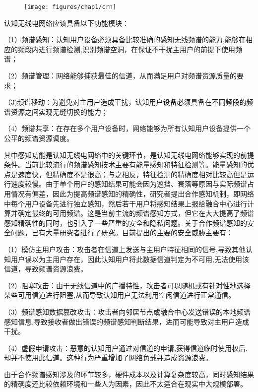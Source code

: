 \begin{figure}[!htp]\label{fig:crn}
  \centering
  \texttt{[image: figures/chap1/crn]}
\end{figure}

认知无线电网络应该具备以下功能模块\cite{akyildiz2006next}：

（1）频谱感知：认知用户设备必须具备比较准确的感知无线频谱的能力,能够在相应的频段内进行频谱检测,识别频谱空洞，在保证不干扰主用户的前提下使用频谱；

（2）频谱管理：网络能够捕获最佳的信道，从而满足用户对频谱资源质量的要求；

（3)频谱移动：为避免对主用户造成干扰，认知用户设备必须具备在不同频段的频谱资源之间实现无缝切换的能力；

（4）频谱共享：在存在多个用户设备时，网络能够为所有认知用户设备提供一个公平的频谱资源调度。

其中感知功能是认知无线电网络中的关键环节，是认知无线电网络能够实现的前提条件。当前比较流行的频谱感知技术主要有能量感知和特征检测等。能量感知的优点是速度快，但精确度不是很高；与之相反，特征检测的精确度相对比较高但是运行速度较慢。由于单个用户的感知结果可能会因为遮挡、衰落等原因与实际频谱占用情况有偏差，因此为提高频谱感知的精确性，研究者提出合作感知机制，即网络中每个用户设备先进行独立感知，然后若干用户将感知结果上报给融合中心进行计算并确定最终的可用频谱。这是当前主流的频谱感知方式，但它在大大提高了频谱感知精确性的同时，也引入了一些严重的安全和隐私问题。关于合作频谱感知的安全问题，已有大量研究者进行了研究。目前提出的主要的安全威胁主要有：

（1）模仿主用户攻击：攻击者在信道上发送与主用户特征相同的信号,导致其他认知用户误以为主用户存在，因此认知用户将此数据信道判定为不可用,无法使用该信道，导致频谱资源浪费。

（2）阻塞攻击：由于无线信道中的广播特性，攻击者可以随机或有针对性地选择某些可用信道进行阻塞,从而导致认知用户无法利用空闲信道进行正常通信。

（3）频谱感知数据篡改攻击：攻击者向邻居节点或融合中心发送错误的本地频谱感知信息,导致接收者做出错误的频谱感知判断结果，进而可能导致对主用户造成干扰。

（4）虚假申请攻击：恶意的认知用户通过对信道的申请,获得信道临时使用权后,却并不使用此信道。这种行为严重增加了网络负载并造成资源浪费。

由于合作频谱感知涉及的环节较多，硬件成本以及计算复杂度较高，同时感知结果的精确度还比较依赖环境和一些人为因素，因此不太适合在现实中大规模部署。


